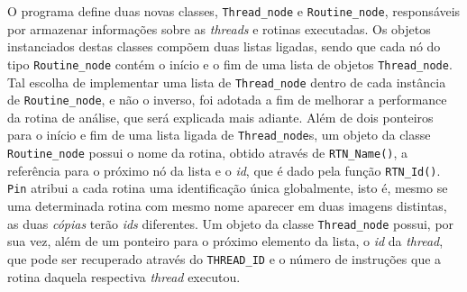 \documentclass[12pt]{article}
\begin{document}
O programa define duas novas classes, \texttt{Thread\_node} e
\texttt{Routine\_node}, responsáveis por armazenar informações sobre as
\textit{threads} e rotinas executadas. Os objetos instanciados destas classes
compõem duas listas ligadas, sendo que cada nó do tipo \texttt{Routine\_node}
contém o início e o fim de uma lista de objetos \texttt{Thread\_node}. Tal
escolha de implementar uma lista de \texttt{Thread\_node} dentro de cada
instância de \texttt{Routine\_node}, e não o inverso, foi adotada a fim de
melhorar a performance da rotina de análise, que será explicada mais adiante.
Além de dois ponteiros para o início e fim de uma lista ligada de
\texttt{Thread\_node}s, um objeto da classe \texttt{Routine\_node} possui o nome
da rotina, obtido através de \texttt{RTN\_Name()}, a referência para o próximo
nó da lista e o \textit{id}, que é dado pela função \texttt{RTN\_Id()}.
\texttt{Pin} atribui a cada rotina uma identificação única globalmente, isto é, 
mesmo se uma determinada rotina com mesmo nome aparecer em duas imagens distintas,
as duas \textit{cópias} terão \textit{ids} diferentes. Um objeto da classe
\texttt{Thread\_node} possui, por sua vez, além de um ponteiro para o próximo
elemento da lista, o \textit{id} da \textit{thread}, que pode ser recuperado
através do \texttt{THREAD\_ID} e o número de instruções que a rotina daquela
respectiva \textit{thread} executou.
\end{document}
